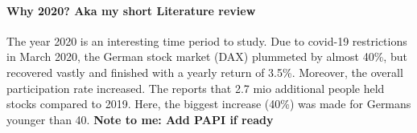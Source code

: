 \documentclass[ProjectABM]{subfiles}
\begin{document}





\paragraph{Why 2020? Aka my short Literature review}
The year 2020 is an interesting time period to study. Due to covid-19 restrictions in March 2020, the German stock market (DAX) plummeted by almost 40\%, but recovered vastly and finished with a yearly return of 3.5\%. Moreover, the overall participation rate increased. The \cite{DAI_2021} reports that 2.7 mio additional people held stocks compared to 2019. Here, the biggest increase (40\%) was made for Germans younger than 40. \textbf{Note to me: Add PAPI if ready}
\end{document}

